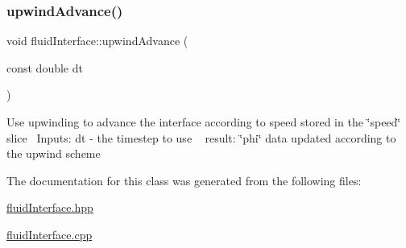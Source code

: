 \mbox{\label{classfluidInterface_ac4422637e35d3bd4f0a08c3b641470f5}} 
\subsubsection{\texorpdfstring{upwind\+Advance()}{upwindAdvance()}}
{\footnotesize\ttfamily void fluid\+Interface\+::upwind\+Advance (\begin{DoxyParamCaption}\item[{const double}]{dt }\end{DoxyParamCaption})}

Use upwinding to advance the interface according to speed stored in the \char`\"{}speed\char`\"{} slice~\newline
Inputs\+: dt -\/ the timestep to use ~\newline
result\+: \char`\"{}phi\char`\"{} data updated according to the upwind scheme 

The documentation for this class was generated from the following files\+:\begin{DoxyCompactItemize}
\item 
\hyperlink{fluidInterface_8hpp}{fluid\+Interface.\+hpp}\item 
\hyperlink{fluidInterface_8cpp}{fluid\+Interface.\+cpp}\end{DoxyCompactItemize}
